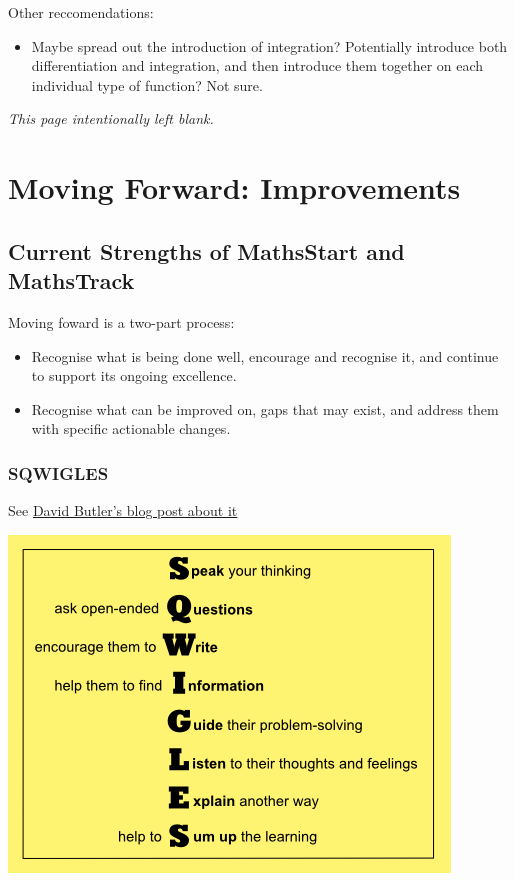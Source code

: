 \documentclass[twoside,12pt,a4paper]{report}
\makeatletter
\newcommand*{\intentionallyblankpage}{
  \vspace*{\fill}
  {\centering \textit{This page intentionally left blank.} \par}
  \vspace{\fill}}
\renewcommand*{\cleardoublepage}{\clearpage\if@twoside \ifodd\c@page\else
  \intentionallyblankpage
  \newpage
  \if@twocolumn\hbox{}\newpage\fi\fi\fi}
\makeatother
\begin{document}
Other reccomendations:
\begin{itemize}
	\item Maybe spread out the introduction of integration? Potentially introduce both differentiation and integration, and then introduce them together on each individual type of function? Not sure.
\end{itemize}


\cleardoublepage
\chapter{Moving Forward: Improvements} 
\label{chap:recommendations}

\lipsum[1]

\section{Current Strengths of MathsStart and MathsTrack}

Moving foward is a two-part process:
\begin{itemize}
	\item Recognise what is being done well, encourage and recognise it, and continue to support its ongoing excellence.
	\item Recognise what can be improved on, gaps that may exist, and address them with specific actionable changes.
\end{itemize}

\subsection{SQWIGLES}

See \href{https://blogs.adelaide.edu.au/maths-learning/2016/09/20/sqwigles/}{David Butler's blog post about it}

\includegraphics{./files/sqwigles.png}
\end{document}
